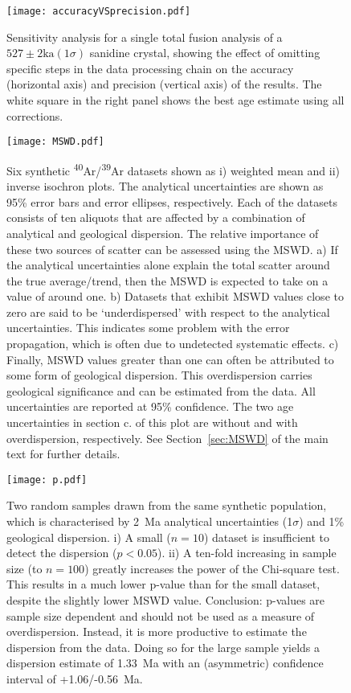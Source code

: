 \documentclass{article}
\begin{document}
\clearpage

\begin{figure}
  \texttt{[image: accuracyVSprecision.pdf]}
  \caption{Sensitivity analysis for a single total fusion analysis of
    a $527 \pm 2 \mathrm{ka} (1\sigma)$ sanidine crystal, showing the
    effect of omitting specific steps in the data processing chain on
    the accuracy (horizontal axis) and precision (vertical axis) of
    the results. The white square in the right panel shows the best
    age estimate using all corrections.}
  \label{fig:accuracyVSprecision}
\end{figure}

\begin{figure}
  \centering
  \texttt{[image: MSWD.pdf]}
  \caption{Six synthetic \textsuperscript{40}Ar/\textsuperscript{39}Ar
    datasets shown as i) weighted mean and ii) inverse isochron plots.
    The analytical uncertainties are shown as 95\% error bars and
    error ellipses, respectively. Each of the datasets consists of ten
    aliquots that are affected by a combination of analytical and
    geological dispersion.  The relative importance of these two
    sources of scatter can be assessed using the MSWD. a) If the
    analytical uncertainties alone explain the total scatter around
    the true average/trend, then the MSWD is expected to take on a
    value of around one. b) Datasets that exhibit MSWD values close to
    zero are said to be `underdispersed' with respect to the
    analytical uncertainties.  This indicates some problem with the
    error propagation, which is often due to undetected systematic
    effects.  c) Finally, MSWD values greater than one can often be
    attributed to some form of geological dispersion. This
    overdispersion carries geological significance and can be
    estimated from the data. All uncertainties are reported at 95\%
    confidence. The two age uncertainties in section c. of this plot
    are without and with overdispersion, respectively. See
    Section~\ref{sec:MSWD} of the main text for further details.}
  \label{fig:MSWD}
\end{figure}

\begin{figure}
  \centering
  \texttt{[image: p.pdf]}
  \caption{Two random samples drawn from the same synthetic
    population, which is characterised by 2~Ma analytical
    uncertainties (1$\sigma$) and 1\% geological dispersion. i) A
    small ($n = 10$) dataset is insufficient to detect the dispersion
    ($p < 0.05$). ii) A ten-fold increasing in sample size (to
    $n=100$) greatly increases the power of the Chi-square test.  This
    results in a much lower p-value than for the small dataset,
    despite the slightly lower MSWD value. Conclusion: p-values are
    sample size dependent and should not be used as a measure of
    overdispersion. Instead, it is more productive to estimate the
    dispersion from the data. Doing so for the large sample yields a
    dispersion estimate of 1.33~Ma with an (asymmetric) confidence
    interval of +1.06/-0.56~Ma.}
  \label{fig:p}
\end{figure}

\clearpage



\end{document}

